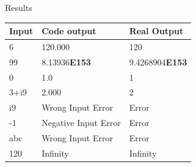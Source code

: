 \documentclass[final]{beamer}
\newlength{\sepwid}
\newlength{\onecolwid}
\newlength{\twocolwid}
\begin{document}
\begin{frame}
\begin{columns}[t]
\begin{column}{\twocolwid}
\begin{columns}[t,totalwidth=\twocolwid]
\begin{column}{\onecolwid}
\begin{exampleblock}{Results}
\begin{tabular}{|p{5cm}|p{11cm}|p{8cm}|}
 \hline
 Input & Code output &Real Output\\
 \hline
 6  & 120.000  &  120\\
 99  &  8.13936\textbf{E153}  &  9.4268904\textbf{E153}\\
 0  & 1.0  &  1\\
 3+i9  & 2.000  &  2\\
 i9  & Wrong Input Error & Error \\
 -1 & Negative Input Error & Error \\
 abc & Wrong Input Error & Error\\
 120 & Infinity & Infinity \\
 \hline
\end{tabular}
\end{exampleblock}

\end{column} %

\end{columns} %



\begin{columns}[t,totalwidth=\twocolwid] %


\begin{column}{\sepwid}\end{column} %

\begin{column}{\onecolwid} %


\end{column} %

\end{columns} %

\end{column} %

\begin{column}{\sepwid}\end{column} %

\begin{column}{\onecolwid} %



\end{column}
\end{columns}
\end{frame}
\end{document}
